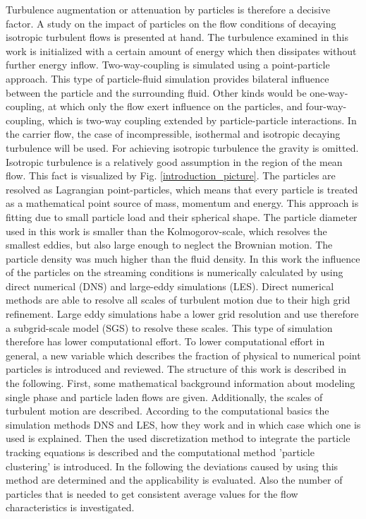 \documentclass[11pt,a4paper,openany,oneside,parskip=half*]{article}
\begin{document}
Turbulence augmentation or attenuation by particles is therefore a decisive factor.
\newline
A study on the impact of particles on the flow conditions of decaying isotropic turbulent flows is presented at hand. The turbulence examined in this work is initialized with a certain amount of energy which then dissipates without further energy inflow. Two-way-coupling is simulated using a point-particle approach. This type of particle-fluid simulation provides bilateral influence between the particle and the surrounding fluid. Other kinds would be one-way-coupling, at which only the flow exert influence on the particles, and four-way-coupling, which is two-way coupling extended by particle-particle interactions. In the carrier flow, the case of incompressible, isothermal and isotropic decaying turbulence will be used. For achieving isotropic turbulence the gravity is omitted. Isotropic turbulence is a relatively good assumption in the region of the mean flow. This fact is visualized by Fig. \ref{introduction_picture}.
The particles are resolved as Lagrangian point-particles, which means that every particle is treated as a mathematical point source of mass, momentum and energy. This approach is fitting due to small particle load and their spherical shape. The particle diameter used in this work is smaller than the Kolmogorov-scale, which resolves the smallest eddies, but also large enough to neglect the Brownian motion. The particle density was much higher than the fluid density.
\newline
In this work the influence of the particles on the streaming conditions is numerically calculated by using direct numerical (DNS) and large-eddy simulations (LES). Direct numerical methods are able to resolve all scales of turbulent motion due to their high grid refinement. Large eddy simulations habe a lower grid resolution and use therefore a subgrid-scale model (SGS) to resolve these scales. This type of simulation therefore has lower computational effort. To lower computational effort in general, a new variable which describes the fraction of physical to numerical point particles is introduced and reviewed.
\newline
The structure of this work is described in the following. 
First, some mathematical background information about modeling single phase and particle laden flows are given. 
Additionally, the scales of turbulent motion are described.
According to the computational basics the simulation methods DNS and LES, how they work and in which case which one is used is explained.
Then the used discretization method to integrate the particle tracking equations is described and the computational method 'particle clustering' is introduced. 
In the following the deviations caused by using this method are determined and the applicability is evaluated.
Also the number of particles that is needed to get consistent average values for the flow characteristics is investigated.
\pagebreak
\end{document}
